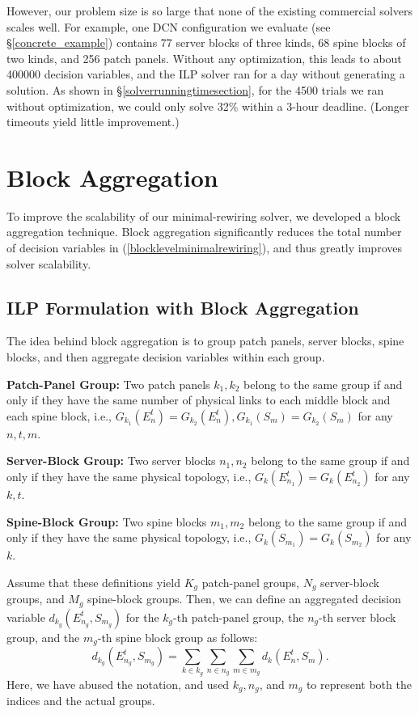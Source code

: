 \documentclass[letterpaper,twocolumn,10pt]{article}
\begin{document}
However, our problem size is so large that none of the existing commercial solvers scales well. For example, one DCN configuration we evaluate (see \S\ref{concrete_example}) contains 77 server blocks of three kinds, 68 spine blocks of two kinds, and 256 patch panels. Without any optimization, this leads to about 400000 decision variables, and the ILP solver ran for a day without generating a solution.  As shown in \S\ref{solverrunningtimesection}, for the 4500 trials we ran without optimization, we could only solve 32\% within a 3-hour deadline. (Longer timeouts yield little improvement.)

\section{Block Aggregation}
To improve the scalability of our minimal-rewiring solver, we developed a block aggregation technique. Block aggregation significantly reduces the total number of decision variables in (\ref{blocklevelminimalrewiring}), and thus greatly improves solver scalability.

\subsection{ILP Formulation with Block Aggregation}
The idea behind block aggregation is to group patch panels, server blocks, spine blocks, and then aggregate decision variables within each group.

{\bf Patch-Panel Group:} Two patch panels $k_1, k_2$ belong to the same group if and only if they have the same number of physical links to each middle block and each spine block, i.e., $G_{k_1}(E_n^t) = G_{k_2}(E_n^t), G_{k_1}(S_m) = G_{k_2}(S_m)$ for any $n, t, m$.

{\bf Server-Block Group:} Two server blocks $n_1, n_2$ belong to the same group if and only if they have the same physical topology, i.e., $G_k(E_{n_1}^t) = G_k(E_{n_2}^t)$ for any $k, t$.

{\bf Spine-Block Group:} Two spine blocks $m_1, m_2$ belong to the same group if and only if they have the same physical topology, i.e., $G_k(S_{m_1}) = G_k(S_{m_2})$ for any $k$.

Assume that these definitions yield $K_g$ patch-panel groups, $N_g$ server-block groups, and $M_g$ spine-block groups. Then, we can define an aggregated decision variable $d_{k_g}(E_{n_g}^t, S_{m_g})$ for the $k_g$-th patch-panel group, the $n_g$-th server block group, and the $m_g$-th spine block group as follows:
\begin{equation}\label{aggregatedvariables}
d_{k_g}(E_{n_g}^t, S_{m_g})=\sum_{k\in k_g}\sum_{n\in n_g}\sum_{m\in m_g}d_k(E_n^t, S_m).
\end{equation}
Here, we have abused the notation, and used $k_g, n_g$, and $m_g$ to represent both the indices and the actual groups.
\end{document}
